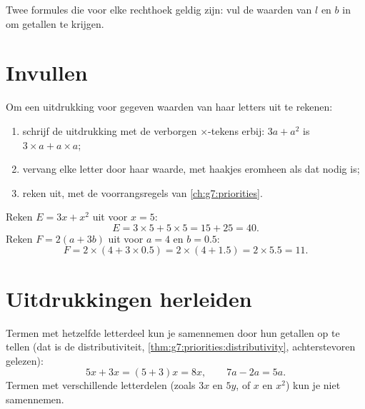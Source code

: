 \begin{omfigure}

{\small Twee formules die voor elke rechthoek geldig zijn: vul de waarden van $l$
en $b$ in om getallen te krijgen.}
\end{omfigure}

\section{Invullen}

\begin{method}\label{met:g7:literal:substitute}
Om een uitdrukking voor gegeven waarden van haar letters uit te rekenen:
\begin{enumerate}
  \item schrijf de uitdrukking met de verborgen $\times$-tekens erbij:
        $3a + a^2$ is $3 \times a + a \times a$;
  \item vervang elke letter door haar waarde, met haakjes eromheen als dat nodig
        is;
  \item reken uit, met de voorrangsregels van \cref{ch:g7:priorities}.
\end{enumerate}
\end{method}

\begin{example}\label{ex:g7:literal:substitute}
Reken $E = 3x + x^2$ uit voor $x = 5$:
\[
E = 3 \times 5 + 5 \times 5 = 15 + 25 = 40 .
\]
Reken $F = 2(a + 3b)$ uit voor $a = 4$ en $b = 0.5$:
\[
F = 2 \times (4 + 3 \times 0.5) = 2 \times (4 + 1.5) = 2 \times 5.5
= 11 .
\]
\end{example}

\section{Uitdrukkingen herleiden}

\begin{proposition}\label{prop:g7:literal:reduce}
Termen met hetzelfde letterdeel kun je samennemen door hun getallen op te tellen
(dat is de distributiviteit, \cref{thm:g7:priorities:distributivity},
achterstevoren gelezen):
\[
5x + 3x = (5 + 3)x = 8x,
\qquad
7a - 2a = 5a .
\]
Termen met verschillende letterdelen (zoals $3x$ en $5y$, of $x$ en $x^2$) kun je
niet samennemen.
\end{proposition}

